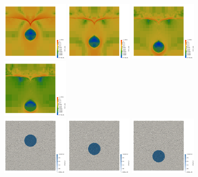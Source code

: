 \begin{center}
\includegraphics[width=3.3cm]{images/stokes_sphere_fs2D/harm_6_1/sr0050}
\includegraphics[width=3.3cm]{images/stokes_sphere_fs2D/harm_6_1/sr0100}
\includegraphics[width=3.3cm]{images/stokes_sphere_fs2D/harm_6_1/sr0150}
\includegraphics[width=3.3cm]{images/stokes_sphere_fs2D/harm_6_1/sr0200}\\
\includegraphics[width=3.3cm]{images/stokes_sphere_fs2D/harm_6_1/swarm_C1_0000}
\includegraphics[width=3.3cm]{images/stokes_sphere_fs2D/harm_6_1/swarm_C1_0050}
\includegraphics[width=3.3cm]{images/stokes_sphere_fs2D/harm_6_1/swarm_C1_0100}

\end{center}
